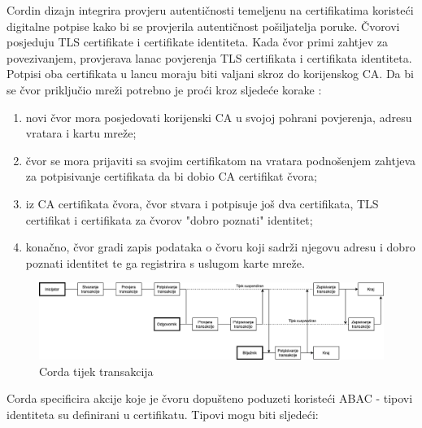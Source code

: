 \documentclass[times, utf8, diplomski]{fer}
\begin{document}
Cordin dizajn integrira provjeru autentičnosti temeljenu na certifikatima koristeći digitalne potpise kako bi se provjerila autentičnost pošiljatelja poruke. Čvorovi posjeduju TLS certifikate i certifikate identiteta. Kada čvor primi zahtjev za povezivanjem, provjerava lanac povjerenja TLS certifikata i certifikata identiteta. Potpisi oba certifikata u lancu moraju biti valjani skroz do korijenskog CA. Da bi se čvor priključio mreži potrebno je proći kroz sljedeće korake \cite{lagarde2019security}:

\begin{enumerate}

\item novi čvor mora posjedovati korijenski CA u svojoj pohrani povjerenja, adresu vratara i kartu mreže;

\item čvor se mora prijaviti sa svojim certifikatom na vratara podnošenjem zahtjeva za potpisivanje certifikata da bi dobio CA certifikat čvora;

\item iz CA certifikata čvora, čvor stvara i potpisuje još dva certifikata, TLS certifikat i certifikata za čvorov "dobro poznati" identitet;

\item konačno, čvor gradi zapis podataka o čvoru koji sadrži njegovu adresu i dobro poznati identitet te ga registrira s uslugom karte mreže.

\end{enumerate}

\begin{figure}[htb]
\centering
\includegraphics[width=15cm]{imgs/Corda flow.png}
\caption{Corda tijek transakcija}
\label{fig:cordaflow}
\end{figure}

Corda specificira akcije koje je čvoru dopušteno poduzeti koristeći ABAC - tipovi identiteta su definirani u certifikatu. Tipovi mogu biti sljedeći:
\end{document}
